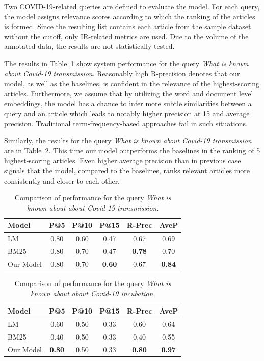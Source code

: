 \documentclass[10pt, a4paper]{article}
\begin{document}
	Two COVID-19-related queries are defined to evaluate the model. For each query, the model assigns relevance scores according to which the ranking of the articles is formed. Since the resulting list contains each article from the sample dataset without the cutoff, only IR-related metrics are used. Due to the volume of the annotated data, the results are not statistically tested. 
	
	The results in Table~\ref{tab:query1} show system performance for the query \textit{What is known about Covid-19 transmission}. Reasonably high R-precision denotes that our model, as well as the baselines, is confident in the relevance of the highest-scoring articles. Furthermore, we assume that by utilizing the word and document level embeddings, the model has a chance to infer more subtle similarities between a query and an article which leads to notably higher precision at 15 and average precision. Traditional term-frequency-based approaches fail in such situations.
	
	Similarly, the results for the query \textit{What is known about Covid-19 transmission} are in Table~\ref{tab:query2}. This time our model outperforms the baselines in the ranking of 5 highest-scoring articles. Even higher average precision than in previous case signals that the model, compared to the baselines, ranks relevant articles more consistently and closer to each other.
	
	\begin{table}
		\caption{Comparison of performance for the query \textit{What is known about about Covid-19 transmission}.}
		\label{tab:query1}
		\begin{center}
			\begin{tabular}{lccccc}
				\toprule
				Model & P@5 & P@10 & P@15 & R-Prec & AveP \\
				\midrule
				LM & 0.80 & 0.60 & 0.47 & 0.67 & 0.69  \\
				BM25 & 0.80 & 0.70 & 0.47 & \textbf{0.78} & 0.70 \\
				Our Model & 0.80 & 0.70 & \textbf{0.60} & 0.67 & \textbf{0.84} \\
				\bottomrule
			\end{tabular}
		\end{center}
	\end{table}
	
	\begin{table}
		\caption{Comparison of performance for the query \textit{What is known about about Covid-19 incubation}.}
		\label{tab:query2}
		\begin{center}
			\begin{tabular}{lccccc}
				\toprule
				Model & P@5 & P@10 & P@15 & R-Prec & AveP \\
				\midrule
				LM & 0.60 & 0.50 & 0.33 & 0.60 & 0.64 \\
				BM25 & 0.40 & 0.50 & 0.33 & 0.40 & 0.55 \\
				Our Model & \textbf{0.80} & 0.50 & 0.33 & \textbf{0.80} & \textbf{0.97} \\
				\bottomrule
			\end{tabular}
		\end{center}
	\end{table}
	
\end{document}
